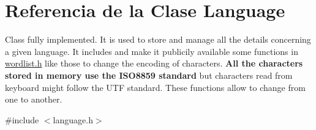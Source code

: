 \hypertarget{classLanguage}{}\section{Referencia de la Clase Language}
\label{classLanguage}


Class fully implemented. It is used to store and manage all the details concerning a given language. It includes and make it publicily available some functions in \hyperlink{wordlist_8h}{wordlist.\+h} like those to change the encoding of characters. {\bfseries All the characters stored in memory use the I\+S\+O8859 standard} but characters read from keyboard might follow the U\+TF standard. These functions allow to change from one to another.  




{\ttfamily \#include $<$language.\+h$>$}

